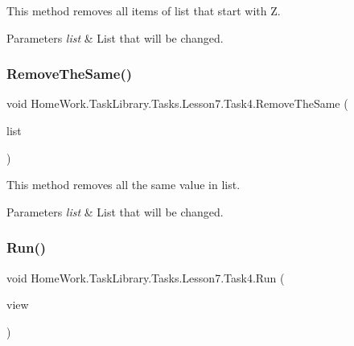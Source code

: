 This method removes all items of list that start with \textquotesingle{}Z\textquotesingle{}. 


\begin{DoxyParams}{Parameters}
{\em list} & List that will be changed.\\
\hline
\end{DoxyParams}
\mbox{\label{class_home_work_1_1_task_library_1_1_tasks_1_1_lesson7_1_1_task4_abf0a4257cf2f98a9f6e26fe83eb50a28}} 
\subsubsection{\texorpdfstring{RemoveTheSame()}{RemoveTheSame()}}
{\footnotesize\ttfamily void Home\+Work.\+Task\+Library.\+Tasks.\+Lesson7.\+Task4.\+Remove\+The\+Same (\begin{DoxyParamCaption}\item[{List$<$ string $>$}]{list }\end{DoxyParamCaption})\hspace{0.3cm}{\ttfamily [private]}}



This method removes all the same value in list. 


\begin{DoxyParams}{Parameters}
{\em list} & List that will be changed.\\
\hline
\end{DoxyParams}
\mbox{\label{class_home_work_1_1_task_library_1_1_tasks_1_1_lesson7_1_1_task4_a4591a8cbde2698fae7e6c90cae079b60}} 
\subsubsection{\texorpdfstring{Run()}{Run()}}
{\footnotesize\ttfamily void Home\+Work.\+Task\+Library.\+Tasks.\+Lesson7.\+Task4.\+Run (\begin{DoxyParamCaption}\item[{I\+Information}]{view }\end{DoxyParamCaption})}



